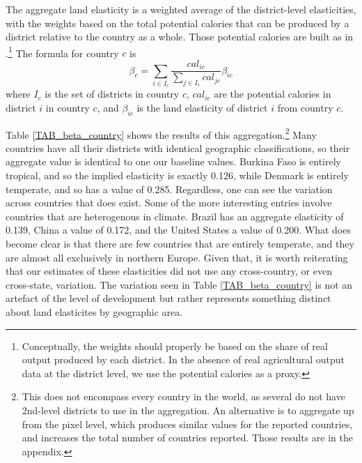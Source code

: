 \documentclass[11pt]{article}
\begin{document}
The aggregate land elasticity is a weighted average of the district-level elasticities, with the weights based on the total potential calories that can be produced by a district relative to the country as a whole. Those potential calories are built as in \citet{galorozak2016}.\footnote{Conceptually, the weights should properly be based on the share of real output produced by each district. In the absence of real agricultural output data at the district level, we use the potential calories as a proxy.} The formula for country $c$ is
\begin{equation}
 	\beta_c = \sum_{i \in I_c} \frac{cal_{ic}}{\sum_{j \in I_c} cal_{jc}} \beta_{ic}
 \end{equation} 
 where $I_c$ is the set of districts in country $c$, $cal_{ic}$ are the potential calories in district $i$ in country $c$, and $\beta_{ic}$ is the land elasticity of district $i$ from country $c$.

Table \ref{TAB_beta_country} shows the results of this aggregation.\footnote{This does not encompass every country in the world, as several do not have 2nd-level districts to use in the aggregation. An alternative is to aggregate up from the pixel level, which produces similar values for the reported countries, and increases the total number of countries reported. Those results are in the appendix.} Many countries have all their districts with identical geographic classifications, so their aggregate value is identical to one our baseline values. Burkina Faso is entirely tropical, and so the implied elasticity is exactly 0.126, while Denmark is entirely temperate, and so has a value of 0.285. Regardless, one can see the variation across countries that does exist. Some of the more interesting entries involve countries that are heterogenous in climate. Brazil has an aggregate elasticity of 0.139, China a value of 0.172, and the United States a value of 0.200. What does become clear is that there are few countries that are entirely temperate, and they are almost all exclusively in northern Europe. Given that, it is worth reiterating that our estimates of these elasticities did not use any cross-country, or even cross-state, variation. The variation seen in Table \ref{TAB_beta_country} is not an artefact of the level of development but rather represents something distinct about land elasticites by geographic area.
\end{document}
